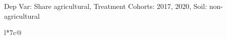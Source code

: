 \begin{table}[H]
\captionlistentry[table]{}
\label{table:beaver_land_class_DVis_land_class_1_SCg23_SSNAG}
\scriptsize %
Dep Var: Share agricultural, Treatment Cohorts: 2017, 2020, Soil: non-agricultural \\
\begin{threeparttable}
\begin{tabulary}{\textwidth}{l*{7}{c}@{}}
\toprule \toprule
\noalign{\smallskip}
\noalign{\smallskip}
\midrule \bottomrule
\end{tabulary}
\medskip
\end{threeparttable}
\end{table}
